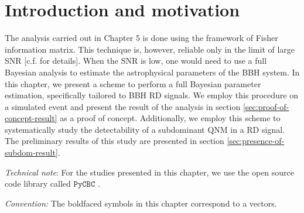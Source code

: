 \newcommand{\Msun}{\ensuremath{\mathrm{M}_\odot}}
\newcommand{\al}{\alpha}
\newcommand{\ddat}{\boldsymbol{\mathcal{D}}} 
\newcommand{\pp}{\mathcal{P}} 
\newcommand{\tth}{\boldsymbol{\vartheta}} 
\newcommand{\mdl}{\mathcal{H}} 
\newcommand{\amp}{\mathcal{A_{lm}}} 
\newcommand{\sig}{\boldsymbol{\mathcal{S}}} 
\newcommand{\nn}{\boldsymbol{\mathcal{N}}}


\section{Introduction and motivation}
The analysis carried out in Chapter 5 is done using the framework of Fisher information matrix. This technique is, however, reliable only in the limit of large SNR [c.f. \cite{2008PhRvD..77d2001V} for details]. When the SNR is low, one would need to use a full Bayesian analysis to estimate the astrophysical parameters of the BBH system. In this chapter, we present a scheme to perform a full Bayesian parameter estimation, specifically tailored to BBH RD signals. We employ this procedure on a simulated event and present the result of the analysis in section \ref{sec:proof-of-concept-result} as a proof of concept. Additionally, we employ this scheme to systematically study the detectability of a subdominant QNM in a RD signal. The preliminary results of this study are presented in section \ref{sec:presence-of-subdom-result}. 

\textit{Technical note}: For the studies presented in this chapter, we use the open source code library called $\texttt{$\texttt{PyCBC}$}$ \cite{Canton:2014ena,Usman:2015kfa,Nitz:2017svb}.

\textit{Convention: } The boldfaced symbols in this chapter correspond to a vectors.  








